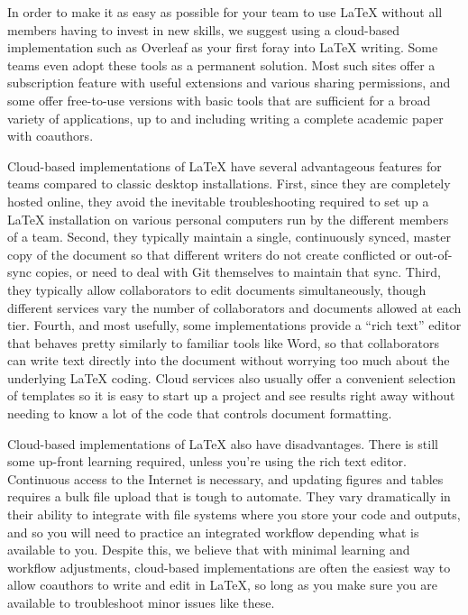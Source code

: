 In order to make it as easy as possible for your team
to use {\LaTeX} without all members having to invest in new skills,
we suggest using a cloud-based implementation such as Overleaf
as your first foray into {\LaTeX} writing.
Some teams even adopt these tools as a permanent solution.
Most such sites offer a subscription feature
with useful extensions and various sharing permissions,
and some offer free-to-use versions with basic tools that are sufficient
for a broad variety of applications,
up to and including writing a complete academic paper with coauthors.

Cloud-based implementations of {\LaTeX} have several advantageous features
for teams compared to classic desktop installations.
First, since they are completely hosted online,
they avoid the inevitable troubleshooting required to set up a {\LaTeX} installation
on various personal computers run by the different members of a team.
Second, they typically maintain a single, continuously synced, master copy of the document
so that different writers do not create conflicted or out-of-sync copies,
or need to deal with Git themselves to maintain that sync.
Third, they typically allow collaborators to edit documents simultaneously,
though different services vary the number of collaborators and documents allowed at each tier.
Fourth, and most usefully, some implementations provide a ``rich text'' editor
that behaves pretty similarly to familiar tools like Word,
so that collaborators can write text directly into the document without worrying too much
about the underlying {\LaTeX} coding.
Cloud services also usually offer a convenient selection of templates
so it is easy to start up a project and see results right away
without needing to know a lot of the code that controls document formatting.

Cloud-based implementations of {\LaTeX} also have disadvantages.
There is still some up-front learning required, unless you're using the rich text editor.
Continuous access to the Internet is necessary,
and updating figures and tables requires a bulk file upload that is tough to automate.
They vary dramatically in their ability to integrate
with file systems where you store your code and outputs,
and so you will need to practice an integrated workflow depending what is available to you.
Despite this, we believe that with minimal learning and workflow adjustments,
cloud-based implementations are often the easiest way to allow coauthors to write and edit in \LaTeX,
so long as you make sure you are available to troubleshoot minor issues like these.

